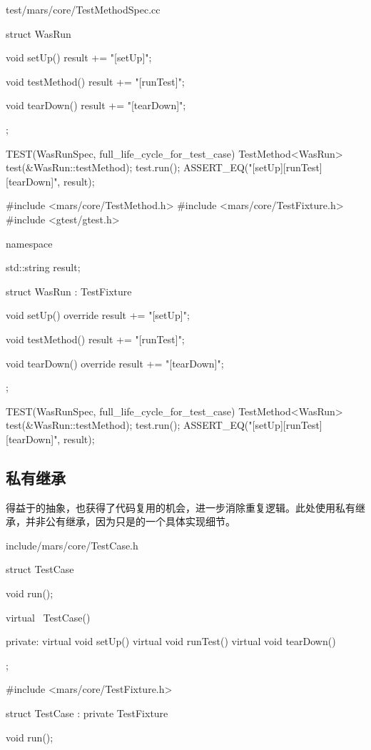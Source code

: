 \begin{content}
\begin{diff}{test/mars/core/TestMethodSpec.cc}
\begin{minicpp}
{  struct WasRun {
    void setUp() {
      result += "[setUp]";
    }

    void testMethod() {
      result += "[runTest]";
    }

    void tearDown() {
      result += "[tearDown]";
    }
  };
}

TEST(WasRunSpec, full_life_cycle_for_test_case) {
  TestMethod<WasRun> test(&WasRun::testMethod);
  test.run();
  ASSERT_EQ("[setUp][runTest][tearDown]", result);
}
\end{minicpp}
\tcblower
\begin{minicpp}
#include <mars/core/TestMethod.h>
#include <mars/core/TestFixture.h>
#include <gtest/gtest.h>

namespace {
  std::string result;

  struct WasRun : TestFixture {
    void setUp() override {
      result += "[setUp]";
    }

    void testMethod() {
      result += "[runTest]";
    }

    void tearDown() override {
      result += "[tearDown]";
    }
  };
}

TEST(WasRunSpec, full_life_cycle_for_test_case) {
  TestMethod<WasRun> test(&WasRun::testMethod);
  test.run();
  ASSERT_EQ("[setUp][runTest][tearDown]", result);
}
\end{minicpp}
\end{diff}

\subsection{私有继承}

得益于的抽象，也获得了代码复用的机会，进一步消除重复逻辑。此处使用私有继承，并非公有继承，因为只是的一个具体实现细节。

\begin{diff}{include/mars/core/TestCase.h}
 \begin{minicpp}
struct TestCase {
  void run();

  virtual ~TestCase() {}

private:
  virtual void setUp() {}
  virtual void runTest() {}
  virtual void tearDown() {}
};
  \end{minicpp}
\tcblower
 \begin{minicpp}
#include <mars/core/TestFixture.h>

struct TestCase : private TestFixture {
  void run();

}
\end{minicpp}
\end{diff}
\end{content}
